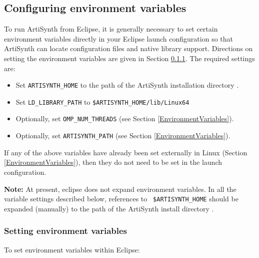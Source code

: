 \documentclass{article}
\def\SEP{/}
\def\SYSTEM{Linux }
\def\ARCH{Linux64 }
\def\directory{directory }
\begin{document}
\subsection{Configuring environment variables}
\label{EclipseEnvironmentVariables}

To run ArtiSynth from Eclipse, it is generally necessary to set certain
environment variables directly in your Eclipse launch configuration so
that ArtiSynth can locate configuration files and native library
support. Directions on setting the environment variables are given
in Section \ref{SettingEnvironmentVariables}. The required
settings are:

\begin{itemize}

\item Set {\tt ARTISYNTH\_HOME} to the path of the ArtiSynth
installation \directory.

\item Set {\tt LD\_LIBRARY\_PATH} to {\tt \$ARTISYNTH\_HOME\SEP lib\SEP \ARCH}

\item Optionally, set {\tt OMP\_NUM\_THREADS} (see Section
\ref{EnvironmentVariables}).

\item Optionally, set {\tt ARTISYNTH\_PATH} 
(see Section \ref{EnvironmentVariables}).

\end{itemize}

If any of the above variables have already been set externally in
\SYSTEM (Section \ref{EnvironmentVariables}), then they do not need to
be set in the launch configuration.

\begin{sideblock}
{\bf Note:} At present, eclipse does not expand environment variables.
In all the variable settings described below, references to {\tt
\$ARTISYNTH\_HOME} should be expanded (manually) to the path of the
ArtiSynth install \directory.
\end{sideblock}

\subsubsection {Setting environment variables}
\label{SettingEnvironmentVariables}

To set environment variables within Eclipse:
\end{document}
